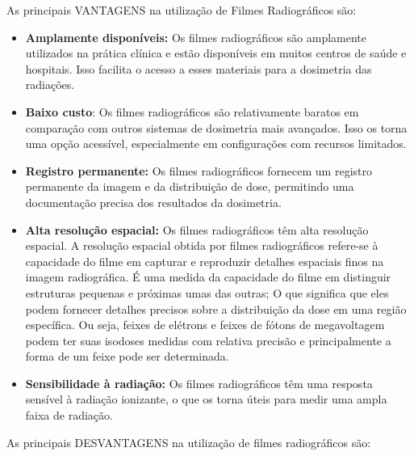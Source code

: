 \documentclass[11pt,a4paper]{article}
\begin{document}
		As principais \textcolor{CarnationPink}{VANTAGENS} na utilização de Filmes Radiográficos são:

		\begin{itemize}[label=\textcolor{CarnationPink}{$\blacktriangleright$}]
			\item \textbf{Amplamente disponíveis:} Os filmes radiográficos são amplamente utilizados na prática clínica e estão disponíveis em muitos centros de saúde e hospitais. Isso facilita o acesso a esses materiais para a dosimetria das radiações.
			\item \textbf{Baixo custo}: Os filmes radiográficos são relativamente baratos em comparação com outros sistemas de dosimetria mais avançados. Isso os torna uma opção acessível, especialmente em configurações com recursos limitados.
			\item \textbf{Registro permanente:} Os filmes radiográficos fornecem um registro permanente da imagem e da distribuição de dose, permitindo uma documentação precisa dos resultados da dosimetria.
			\item \textbf{Alta resolução espacial:} Os filmes radiográficos têm alta resolução espacial. A resolução espacial obtida por filmes radiográficos refere-se à capacidade do filme em capturar e reproduzir detalhes espaciais finos na imagem radiográfica. É uma medida da capacidade do filme em distinguir estruturas pequenas e próximas umas das outras; O que significa que eles podem fornecer detalhes precisos sobre a distribuição da dose em uma região específica. Ou seja, feixes de elétrons e feixes de fótons de megavoltagem podem ter suas isodoses medidas com relativa precisão e principalmente a forma de um feixe pode ser determinada.
			\item \textbf{Sensibilidade à radiação:} Os filmes radiográficos têm uma resposta sensível à radiação ionizante, o que os torna úteis para medir uma ampla faixa de radiação.
		\end{itemize}

		As principais \textcolor{CarnationPink}{DESVANTAGENS} na utilização de filmes radiográficos são:
\end{document}
